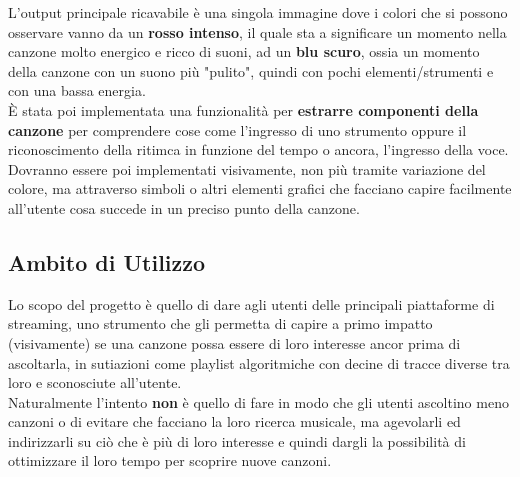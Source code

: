 \documentclass{article}
\begin{document}
L'output principale ricavabile è una singola immagine dove i colori che si
possono osservare vanno da un \textbf{rosso intenso}, il quale sta a
significare un momento nella canzone molto energico e ricco di suoni, ad un
\textbf{blu scuro}, ossia un momento della canzone con un suono più "pulito",
quindi con pochi elementi/strumenti e con una bassa energia.\\ È stata poi
implementata una funzionalità per \textbf{estrarre componenti della canzone}
per comprendere cose come l'ingresso di uno strumento oppure il riconoscimento
della ritimca in funzione del tempo o ancora, l'ingresso della voce. Dovranno
essere poi implementati visivamente, non più tramite variazione del colore, ma
attraverso simboli o altri elementi grafici che facciano capire facilmente
all'utente cosa succede in un preciso punto della canzone.

\subsection{Ambito di Utilizzo}
Lo scopo del progetto è quello di dare agli utenti delle principali piattaforme
di streaming, uno strumento che gli permetta di capire a primo impatto
(visivamente) se una canzone possa essere di loro interesse ancor prima di
ascoltarla, in sutiazioni come playlist algoritmiche con decine di tracce
diverse tra loro e sconosciute all'utente.\\

Naturalmente l'intento \textbf{non} è quello di fare in modo che gli utenti
ascoltino meno canzoni o di evitare che facciano la loro ricerca musicale, ma
agevolarli ed indirizzarli su ciò che è più di loro interesse e quindi dargli
la possibilità di ottimizzare il loro tempo per scoprire nuove canzoni.

\newpage
\end{document}
